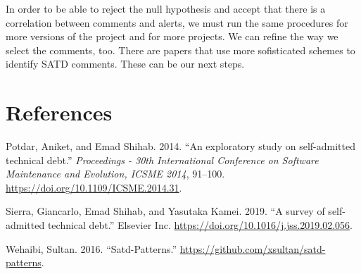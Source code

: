 \documentclass[
]{article}
\begin{document}
\normalsize

In order to be able to reject the null hypothesis and accept that there
is a correlation between comments and alerts, we must run the same
procedures for more versions of the project and for more projects. We
can refine the way we select the comments, too. There are papers that
use more sofisticated schemes to identify SATD comments. These can be
our next steps.

\section{References}

\hypertarget{refs}{}
\leavevmode\hypertarget{ref-Potdar2014}{}%
Potdar, Aniket, and Emad Shihab. 2014. ``An exploratory study on
self-admitted technical debt.'' \emph{Proceedings - 30th International
Conference on Software Maintenance and Evolution, ICSME 2014}, 91--100.
\url{https://doi.org/10.1109/ICSME.2014.31}.

\leavevmode\hypertarget{ref-Sierra2019}{}%
Sierra, Giancarlo, Emad Shihab, and Yasutaka Kamei. 2019. ``A survey of
self-admitted technical debt.'' Elsevier Inc.
\url{https://doi.org/10.1016/j.jss.2019.02.056}.

\leavevmode\hypertarget{ref-Wehaibi2016}{}%
Wehaibi, Sultan. 2016. ``Satd-Patterns.''
\url{https://github.com/xsultan/satd-patterns}.
\end{document}

